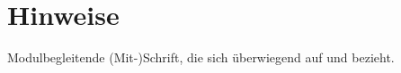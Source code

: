 \section*{Hinweise}
Modulbegleitende (Mit-)Schrift, die sich überwiegend auf \cite{Wed09} und \cite{Wed09b} bezieht.